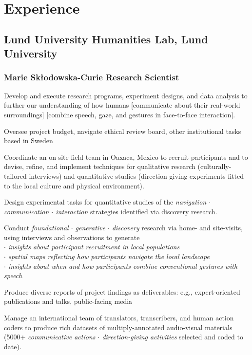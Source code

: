\documentclass[11pt, oneside]{memoir}
\newcommand{\position}[2]{
     \subsubsection{#1\hfill\mdseries{#2}}}
\begin{document}
\section{Experience}
\subsection{Lund University Humanities Lab, Lund University}
\position{Marie Skłodowska-Curie Research Scientist}{2019--present}

Develop and execute research programs, experiment designs, and data analysis to further our understanding of how humans [communicate about their real-world surroundings] [combine speech, gaze, and gestures in face-to-face interaction]. 

Oversee project budget, navigate ethical review board, other institutional tasks based in Sweden

Coordinate an on-site field team in Oaxaca, Mexico to recruit participants and to devise, refine, and implement techniques for qualitative research (culturally-tailored interviews) and quantitative studies (direction-giving experiments fitted to the local culture and physical environment). 

Design experimental tasks for quantitative studies of the \emph{navigation $\cdot$ communication $\cdot$ interaction} strategies identified via discovery research.   

Conduct \emph{foundational $\cdot$ generative $\cdot$ discovery} research via home- and site-visits, using interviews and observations to generate\\ \emph{
$\cdot$ insights about participant recruitment in local populations \\
$\cdot$ spatial maps reflecting how participants navigate the local landscape \\
$\cdot$ insights about when and how participants combine conventional gestures with speech
}


Produce diverse reports of project findings as deliverables: e.g., expert-oriented publications and talks, public-facing media




Manage an international team of translators, transcribers, and human action coders to produce rich datasets of multiply-annotated audio-visual materials (5000+ \emph{communicative actions $\cdot$ direction-giving activities} selected and coded to date).  
\end{document}
